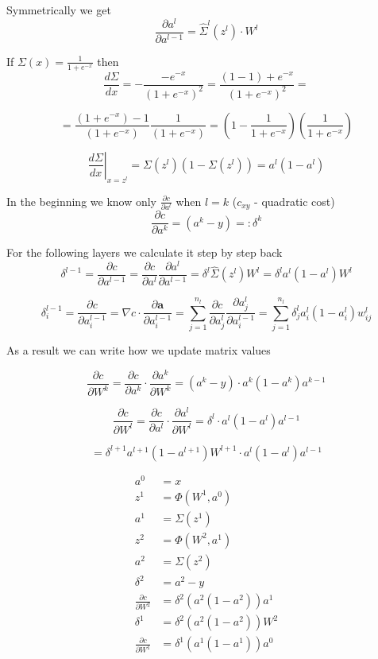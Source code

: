 \documentclass[draft]{article}
\begin{document}
Symmetrically we get
\[
\frac{\partial a^l}{\partial a^{l-1}} = \hat\Sigma^l(z^l) \cdot W^l
\]

If $\Sigma(x)=\frac{1}{1+e^{-x}}$ then
\[
\frac{d\Sigma}{dx} = - \frac{-e^{-x}}{(1+e^{-x})^2} = \frac{(1 - 1) + e^{-x}}{(1+e^{-x})^2} = 
\]

\[
= \frac{(1+e^{-x}) - 1}{(1+e^{-x})} \frac{1}{(1+e^{-x})} = \left(1 - \frac{1}{1+e^{-x}}\right) \left(\frac{1}{1+e^{-x}}\right)
\]

\[
\left. \frac{d\Sigma}{dx}\right|_{x=z^l} = \Sigma(z^l)(1 - \Sigma(z^l)) = a^l(1 - a^l)
\]

In the beginning we know only $\frac{\partial c}{\partial a^l}$ when $l=k$ ($c_{xy}$ - quadratic cost)
\[
\frac{\partial c}{\partial a^k} = (a^k - y) =: \delta^k
\]

For the following layers we calculate it step by step back
\[
\delta^{l-1} = \frac{\partial c}{\partial a^{l-1}} = \frac{\partial c}{\partial a^l} \frac{\partial a^l}{\partial a^{l-1}} = \delta^l \hat\Sigma(z^l)W^l = \delta^l a^l(1-a^l)W^l
\]

\[
\delta_i^{l-1} = \frac{\partial c}{\partial a_i^{l-1}} = \nabla c \cdot \frac{\partial \mathbf{a}}{\partial a_i^{l-1}} = \sum_{j=1}^{n_l} \frac{\partial c}{\partial a_j^l} \frac{\partial a_j^l}{\partial a_i^{l-1}} = \sum_{j=1}^{n_l} \delta_j^l a_i^l(1-a_i^l)w_{ij}^l
\]

As a result we can write how we update matrix values

\[
\frac{\partial c}{\partial W^k} = \frac{\partial c}{\partial a^k} \cdot \frac{\partial a^k}{\partial W^k} = (a^k - y) \cdot a^k(1 - a^k) a^{k-1}
\]

\[
\frac{\partial c}{\partial W^{l}} = \frac{\partial c}{\partial a^{l}} \cdot \frac{\partial a^{l}}{\partial W^{l}} = \delta^{l} \cdot a^l(1 - a^l) a^{l-1}
\]

\[
 = \delta^{l+1} a^{l+1}(1-a^{l+1})W^{l+1} \cdot a^l(1 - a^l) a^{l-1}
\]

\begin{align}
a^0 &= x \\
z^1 &= \Phi(W^1, a^0) \\
a^1 &= \Sigma(z^1) \\
z^2 &= \Phi(W^2, a^1) \\
a^2 &= \Sigma(z^2) \\
\delta^2 &= a^2 - y \\
\frac{\partial c}{\partial W^2} &= \delta^2 (a^2 (1-a^2) ) a^1 \\
\delta^1 &= \delta^2 (a^2 (1-a^2 )) W^2 \\
\frac{\partial c}{\partial W^1} &= \delta^1 (a^1 (1-a^1) ) a^0
\end{align}
\end{document}
